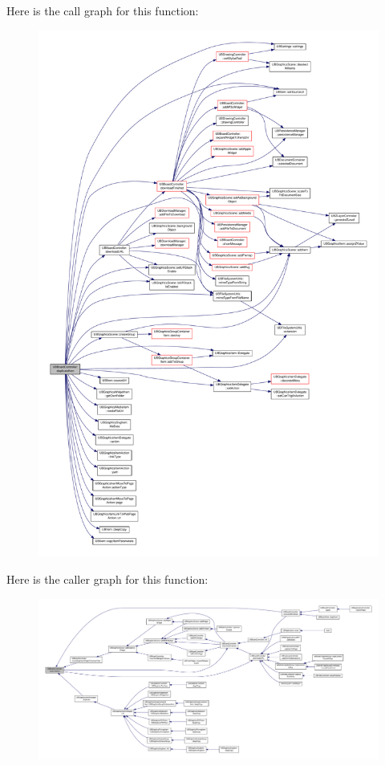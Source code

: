 Here is the call graph for this function\-:
\nopagebreak
\begin{figure}[H]
\begin{center}
\leavevmode
\includegraphics[width=350pt]{d7/d62/class_u_b_board_controller_abae2655269e06f72767de71b8513f6be_cgraph}
\end{center}
\end{figure}




Here is the caller graph for this function\-:
\nopagebreak
\begin{figure}[H]
\begin{center}
\leavevmode
\includegraphics[width=350pt]{d7/d62/class_u_b_board_controller_abae2655269e06f72767de71b8513f6be_icgraph}
\end{center}
\end{figure}


